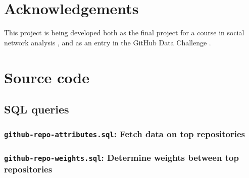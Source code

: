 \documentclass[twocolumn]{article}
\begin{document}
\section{Acknowledgements}
This project is being developed both as the final project for a course in social
network analysis \cite{snacourse}, and as an entry in the GitHub Data Challenge
\cite{doll13}.




\onecolumn
\appendix
\section{Source code}
\label{app:code}
\subsection{SQL queries}

\subsubsection{\texttt{github-repo-attributes.sql}: Fetch data on top
repositories}


\subsubsection{\texttt{github-repo-weights.sql}: Determine weights between top
repositories}

\end{document}
